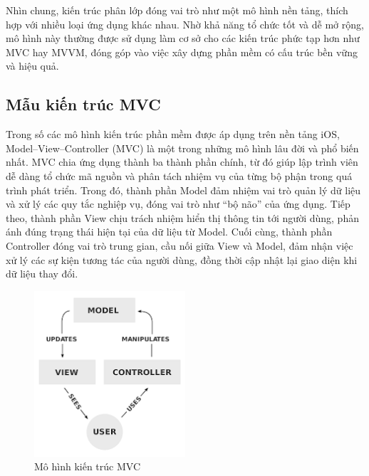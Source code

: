     \begin{flushleft}
        \hspace*{0.8cm}Nhìn chung, kiến trúc phân lớp đóng vai trò như một mô hình nền tảng, thích hợp với nhiều loại ứng dụng khác nhau. Nhờ khả năng tổ chức tốt và dễ mở rộng, mô hình này thường được sử dụng làm cơ sở cho các kiến trúc phức tạp hơn như MVC hay MVVM, đóng góp vào việc xây dựng phần mềm có cấu trúc bền vững và hiệu quả.
    \end{flushleft}

\subsection{Mẫu kiến trúc MVC}
\renewcommand{\labelitemi}{--}    
    \begin{flushleft}
        \hspace*{0.8cm}Trong số các mô hình kiến trúc phần mềm được áp dụng trên nền tảng iOS, Model–View–Controller (MVC) là một trong những mô hình lâu đời và phổ biến nhất. MVC chia ứng dụng thành ba thành phần chính, từ đó giúp lập trình viên dễ dàng tổ chức mã nguồn và phân tách nhiệm vụ của từng bộ phận trong quá trình phát triển. Trong đó, thành phần Model đảm nhiệm vai trò quản lý dữ liệu và xử lý các quy tắc nghiệp vụ, đóng vai trò như “bộ não” của ứng dụng. Tiếp theo, thành phần View chịu trách nhiệm hiển thị thông tin tới người dùng, phản ánh đúng trạng thái hiện tại của dữ liệu từ Model. Cuối cùng, thành phần Controller đóng vai trò trung gian, cầu nối giữa View và Model, đảm nhận việc xử lý các sự kiện tương tác của người dùng, đồng thời cập nhật lại giao diện khi dữ liệu thay đổi.
    \end{flushleft}

\begin{figure}[h]
    \centering
    \includegraphics[width=0.5\textwidth]{images/mvc.png}
    \caption{Mô hình kiến trúc MVC}
    \label{fig:fig12}
  \end{figure}

